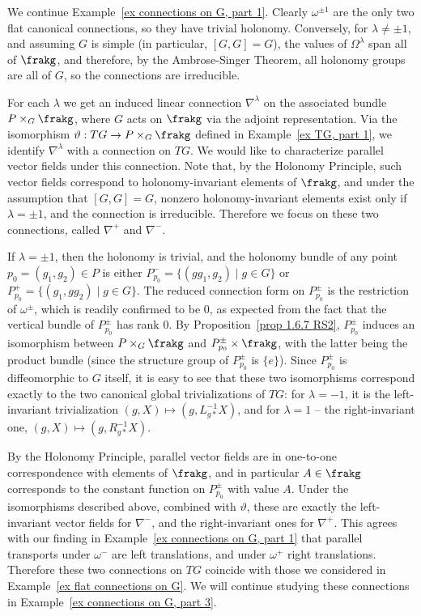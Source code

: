 \begin{example}\label{ex connections on G, part 2}
    We continue Example~\ref{ex connections on G, part 1}.
    Clearly $\omega^{\pm 1}$ are the only two flat canonical connections, so they have trivial holonomy. Conversely, for $\lambda\neq\pm 1$, and assuming $G$ is simple (in particular, $[G,G]=G$), the values of $\Omega^\lambda$ span all of $\frakg$, and therefore, by the Ambrose-Singer Theorem, all holonomy groups are all of $G$, so the connections are irreducible.

    For each $\lambda$ we get an induced linear connection $\nabla^\lambda$ on the associated bundle $P\times_G \frakg$, where $G$ acts on $\frakg$ via the adjoint representation. Via the isomorphism $\vartheta:TG\to P\times_G \frakg$ defined in Example~\ref{ex TG, part 1}, we identify $\nabla^\lambda$ with a connection on $TG$. We would like to characterize parallel vector fields under this connection. Note that, by the Holonomy Principle, such vector fields correspond to holonomy-invariant elements of $\frakg$, and under the assumption that $[G,G]=G$, nonzero holonomy-invariant elements exist only if $\lambda=\pm 1$, and the connection is irreducible. Therefore we focus on these two connections, called $\nabla^+$ and $\nabla^-$.
    
    If $\lambda=\pm 1$, then the holonomy is trivial, and the holonomy bundle of any point $p_0=(g_1,g_2)\in P$ is either $P^{-}_{p_0}=\{(gg_1,g_2)\mid g\in G\}$ or $P^{+}_{p_0}=\{(g_1,gg_2)\mid g\in G\}$. The reduced connection form on $P_{p_0}^{\pm}$ is the restriction of $\omega^{\pm}$, which is readily confirmed to be $0$, as expected from the fact that the vertical bundle of $P_{p_0}^{\pm}$ has rank $0$. By Proposition~\ref{prop 1.6.7 RS2}, $P_{p_0}^{\pm}$ induces an isomorphism between $P\times_G\frakg$ and $P_{p_0}^{\pm}\times\frakg$, with the latter being the product bundle (since the structure group of $P_{p_0}^{\pm}$ is $\{e\}$). Since $P_{p_0}^{\pm}$ is diffeomorphic to $G$ itself, it is easy to see that these two isomorphisms correspond exactly to the two canonical global trivializations of $TG$: for $\lambda=-1$, it is the left-invariant trivialization $(g,X)\mapsto (g,L_{g\ast}^{-1}X)$, and for $\lambda=1$ -- the right-invariant one, $(g,X)\mapsto (g,R_{g\ast}^{-1}X)$. 

    By the Holonomy Principle, parallel vector fields are in one-to-one correspondence with elements of $\frakg$, and in particular $A\in \frakg$ corresponds to the constant function on $P_{p_0}^{\pm}$ with value $A$. Under the isomorphisms described above, combined with $\vartheta$, these are exactly the left-invariant vector fields for $\nabla^-$, and the right-invariant ones for $\nabla^+$. This agrees with our finding in Example~\ref{ex connections on G, part 1} that parallel transports under $\omega^-$ are left translations, and under $\omega^+$ right translations. Therefore these two connections on $TG$ coincide with those we considered in Example~\ref{ex flat connections on G}. We will continue studying these connections in Example~\ref{ex connections on G, part 3}.
\end{example}
